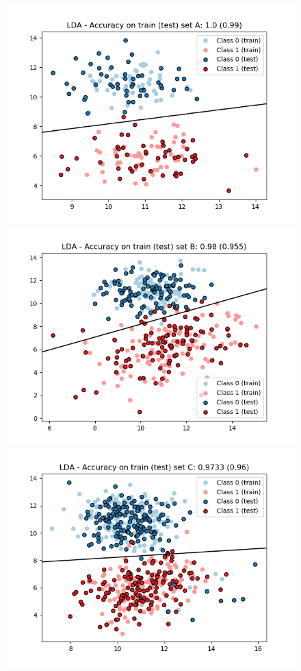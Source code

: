 \documentclass[a4paper, 11pt]{article}
\begin{document}
\begin{enumerate}[label=\alph*]
        \begin{figure}[!htb]
          \includegraphics[width=\linewidth]{./images/LDA_A.png}
          \label{fig:lda_a}
        \endminipage\hfill
          \includegraphics[width=\linewidth]{./images/LDA_B.png}
          \label{fig:lda_b}
        \endminipage\hfill
        \vspace*{-.8cm}
          \includegraphics[width=\linewidth]{./images/LDA_C.png}

\end{figure}
\end{enumerate}
\end{document}
